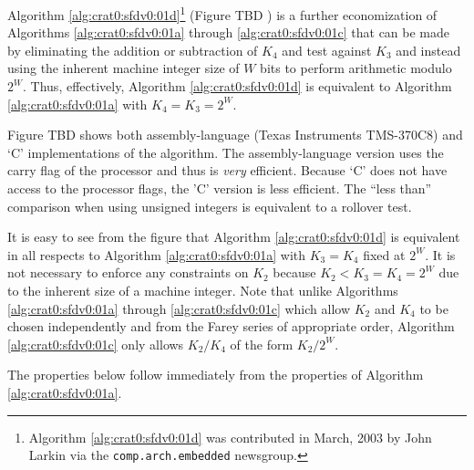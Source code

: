 Algorithm \ref{alg:crat0:sfdv0:01d}\footnote{Algorithm \ref{alg:crat0:sfdv0:01d} 
was contributed in March, 2003
by John Larkin \cite{bibref:i:johnlarkin}
via the
\texttt{comp.arch.embedded} \cite{bibref:n:comparchembedded} 
newsgroup.}
(Figure TBD
) is a further
economization of Algorithms \ref{alg:crat0:sfdv0:01a}
through \ref{alg:crat0:sfdv0:01c} that can be made by eliminating 
the addition or subtraction of $K_4$ and test against $K_3$ 
and instead using the
inherent machine integer size of $W$ bits to perform
arithmetic modulo $2^W$.  Thus, effectively, Algorithm \ref{alg:crat0:sfdv0:01d} 
is equivalent to Algorithm \ref{alg:crat0:sfdv0:01a} with
$K_4 = K_3 = 2^W$.

Figure TBD
shows both
assembly-language (Texas Instruments TMS-370C8) and
`C' implementations of the algorithm.  The assembly-language
version uses the carry flag of the processor and thus
is \emph{very} efficient.  Because `C' does not have access
to the processor flags, the 'C' version is less efficient.
The ``less than'' comparison when
using unsigned integers is equivalent to a rollover test.

It is easy to see from the figure that Algorithm \ref{alg:crat0:sfdv0:01d} 
is equivalent in all
respects to Algorithm \ref{alg:crat0:sfdv0:01a} with
$K_3 = K_4$ fixed at $2^W$.  It is not necessary to enforce any constraints
on $K_2$ because $K_2 < K_3 = K_4 = 2^W$ due to the inherent size of
a machine integer.  Note that unlike Algorithms \ref{alg:crat0:sfdv0:01a} 
through \ref{alg:crat0:sfdv0:01c} which allow $K_2$ and $K_4$ to be chosen independently
and from the Farey series of appropriate order, Algorithm \ref{alg:crat0:sfdv0:01c} 
only allows
$K_2/K_4$ of the form $K_2/2^W$.

The properties below follow immediately
from the properties of Algorithm \ref{alg:crat0:sfdv0:01a}.

